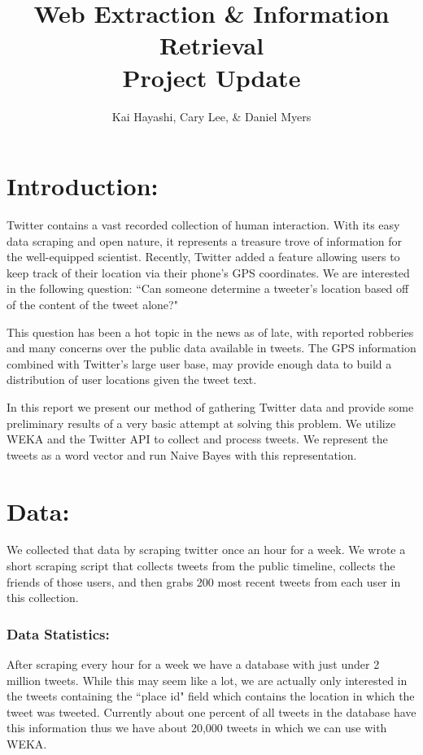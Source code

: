 \documentclass[12pt]{article}
\title{Web Extraction \& Information Retrieval \\ Project Update}
\author{Kai Hayashi, Cary Lee, \& Daniel Myers}
\date{}                                           %
\begin{document}
\maketitle
\section*{Introduction:}
Twitter contains a vast recorded collection of human interaction. With its easy data scraping and open nature, it represents a treasure trove of information for the well-equipped scientist. Recently, Twitter added a feature allowing users to keep track of their location via their phone's GPS coordinates. We are interested in the following question: ``Can someone determine a tweeter's location based off of the content of the tweet alone?"

This question has been a hot topic in the news as of late, with reported robberies and many concerns over the public data available in tweets. The GPS information combined with Twitter's large user base, may provide enough data to build a distribution of user locations given the tweet text. 

In this report we present our method of gathering Twitter data and provide some preliminary results of a very basic attempt at solving this problem. We utilize WEKA and the Twitter API to collect and process tweets. We represent the tweets as a word vector and run Naive Bayes with this representation.

\section*{Data:}
We collected that data by scraping twitter once an hour for a week. We wrote a short scraping script that collects tweets from the public timeline, collects the friends of those users, and then grabs 200 most recent tweets from each user in this collection. 


\subsubsection*{Data Statistics:}
After scraping every hour for a week we have a database with just under 2 million tweets.  While this may seem like a lot, we are actually only interested in the tweets containing the ``place id" field which contains the location in which the tweet was tweeted.  Currently about one percent of all tweets in the database have this information thus we have about 20,000 tweets in which we can use with WEKA.
\end{document}
